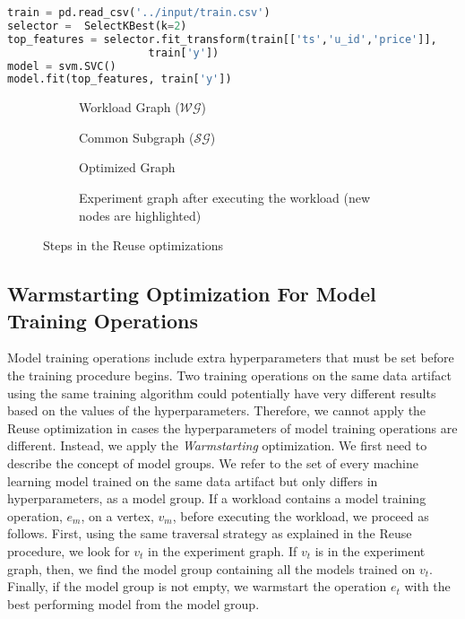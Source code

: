 \begin{lstlisting}[language=Python, firstnumber = 8,caption=New workload script (Imports are omitted),captionpos=b,label = {listing-reuse}]
train = pd.read_csv('../input/train.csv') 
selector =  SelectKBest(k=2)
top_features = selector.fit_transform(train[['ts','u_id','price']], 
				      train['y'])
model = svm.SVC()
model.fit(top_features, train['y'])
\end{lstlisting}

\begin{figure}
\captionsetup[subfigure]{justification=centering}
\begin{subfigure}[t]{0.33\linewidth}
\centering

\caption{Workload Graph ($\mathcal{WG}$)}
\end{subfigure}%
\begin{subfigure}[t]{0.33\linewidth}
\centering

\caption{Common Subgraph ($\mathcal{SG}$)}
\end{subfigure}%
\begin{subfigure}[t]{0.33\linewidth}
\centering

\caption{Optimized Graph}
\end{subfigure}
\begin{subfigure}[t]{\linewidth}
\centering

\caption{Experiment graph after executing the workload (new nodes are highlighted)}
\end{subfigure}
\caption{Steps in the Reuse optimizations}
\label{fig-reuse}
\end{figure}

\subsection{Warmstarting Optimization For Model Training Operations}
Model training operations include extra hyperparameters that must be set before the training procedure begins.
Two training operations on the same data artifact using the same training algorithm could potentially have very different results based on the values of the hyperparameters.
Therefore, we cannot apply the Reuse optimization in cases the hyperparameters of model training operations are different.
Instead, we apply the \textit{Warmstarting} optimization.
We first need to describe the concept of model groups.
We refer to the set of every machine learning model trained on the same data artifact but only differs in hyperparameters, as a model group.
If a workload contains a model training operation, $e_{m}$, on a vertex, $v_{m}$, before executing the workload, we proceed as follows.
First, using the same traversal strategy as explained in the Reuse procedure, we look for $v_{t}$ in the experiment graph.
If $v_{t}$ is in the experiment graph, then, we find the model group containing all the models  trained on $v_{t}$.
Finally, if the model group is not empty, we warmstart the operation $e_{t}$ with the best performing model from the model group.

